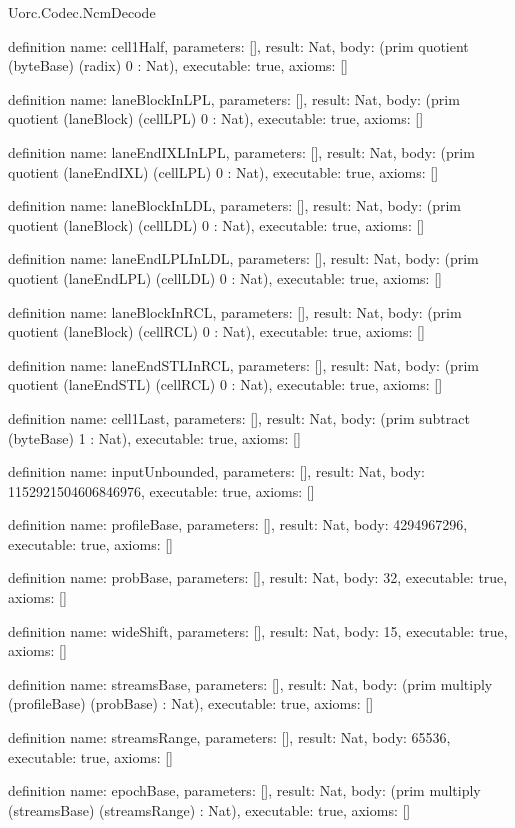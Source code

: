 \begin{lexlean}{Uorc.Codec.NcmDecode}
\begin{semanticmodule}
definition{
  name: cell1Half,
  parameters: [],
  result: Nat,
  body: (prim quotient (byteBase) (radix) 0 : Nat),
  executable: true,
  axioms: []
}

definition{
  name: laneBlockInLPL,
  parameters: [],
  result: Nat,
  body: (prim quotient (laneBlock) (cellLPL) 0 : Nat),
  executable: true,
  axioms: []
}

definition{
  name: laneEndIXLInLPL,
  parameters: [],
  result: Nat,
  body: (prim quotient (laneEndIXL) (cellLPL) 0 : Nat),
  executable: true,
  axioms: []
}

definition{
  name: laneBlockInLDL,
  parameters: [],
  result: Nat,
  body: (prim quotient (laneBlock) (cellLDL) 0 : Nat),
  executable: true,
  axioms: []
}

definition{
  name: laneEndLPLInLDL,
  parameters: [],
  result: Nat,
  body: (prim quotient (laneEndLPL) (cellLDL) 0 : Nat),
  executable: true,
  axioms: []
}

definition{
  name: laneBlockInRCL,
  parameters: [],
  result: Nat,
  body: (prim quotient (laneBlock) (cellRCL) 0 : Nat),
  executable: true,
  axioms: []
}

definition{
  name: laneEndSTLInRCL,
  parameters: [],
  result: Nat,
  body: (prim quotient (laneEndSTL) (cellRCL) 0 : Nat),
  executable: true,
  axioms: []
}

definition{
  name: cell1Last,
  parameters: [],
  result: Nat,
  body: (prim subtract (byteBase) 1 : Nat),
  executable: true,
  axioms: []
}

definition{
  name: inputUnbounded,
  parameters: [],
  result: Nat,
  body: 1152921504606846976,
  executable: true,
  axioms: []
}

definition{
  name: profileBase,
  parameters: [],
  result: Nat,
  body: 4294967296,
  executable: true,
  axioms: []
}

definition{
  name: probBase,
  parameters: [],
  result: Nat,
  body: 32,
  executable: true,
  axioms: []
}

definition{
  name: wideShift,
  parameters: [],
  result: Nat,
  body: 15,
  executable: true,
  axioms: []
}

definition{
  name: streamsBase,
  parameters: [],
  result: Nat,
  body: (prim multiply (profileBase) (probBase) : Nat),
  executable: true,
  axioms: []
}

definition{
  name: streamsRange,
  parameters: [],
  result: Nat,
  body: 65536,
  executable: true,
  axioms: []
}

definition{
  name: epochBase,
  parameters: [],
  result: Nat,
  body: (prim multiply (streamsBase) (streamsRange) : Nat),
  executable: true,
  axioms: []
}


\end{semanticmodule}
\end{lexlean}

